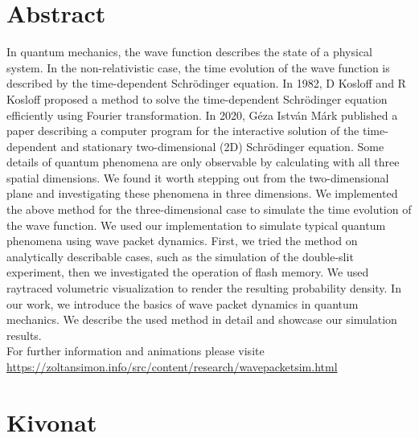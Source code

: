 \section*{Abstract}

In quantum mechanics, the wave function describes the state of a physical system. In the non-relativistic case, the time evolution of the wave function is described by the time-dependent Schrö\-din\-ger equation. In 1982, D Kosloff and R Kosloff proposed a method \cite{KOSLOFF198335} to solve the time-dependent Schrödinger equation efficiently using Fourier transformation. In 2020, Géza István Márk published a paper \cite{mark2020webschrodinger} describing a computer program for the interactive solution of the time-dependent and stationary two-dimensional (2D) Schrödinger equation. Some details of quantum phenomena are only observable by calculating with all three spatial dimensions. We found it worth stepping out from the two-dimensional plane and investigating these phenomena in three dimensions. We implemented the above method for the three-dimensional case to simulate the time evolution of the wave function. We used our implementation to simulate typical quantum phenomena using wave packet dynamics. First, we tried the method on analytically describable cases, such as the simulation of the double-slit experiment, then we investigated the operation of flash memory. We used raytraced volumetric visualization to render the resulting probability density. In our work, we introduce the basics of wave packet dynamics in quantum mechanics. We describe the used method in detail and showcase our simulation results.\\
For further information and animations please visite\\ \url{https://zoltansimon.info/src/content/research/wavepacketsim.html}

\section*{Kivonat}

